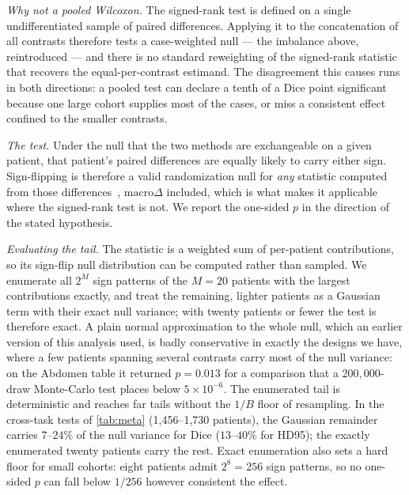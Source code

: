 \emph{Why not a pooled Wilcoxon.} The signed-rank test is defined on a
single undifferentiated sample of paired differences. Applying it to the
concatenation of all contrasts therefore tests a case-weighted null --- the
imbalance above, reintroduced --- and there is no standard reweighting of
the signed-rank statistic that recovers the equal-per-contrast estimand.
The disagreement this causes runs in both directions: a pooled test can
declare a tenth of a Dice point significant because one large cohort supplies
most of the cases, or miss a consistent effect confined to the smaller
contrasts.

\emph{The test.} Under the null that the two methods are exchangeable on a
given patient, that patient's paired differences are equally likely to carry
either sign. Sign-flipping is therefore a valid randomization null for \emph{any}
statistic computed from those differences~\cite{ernst2004permutation},
$\text{macro}\Delta$ included, which is what makes it applicable where the
signed-rank test is not. We
report the one-sided $p$ in the direction of the stated hypothesis.

\emph{Evaluating the tail.} The statistic is a weighted sum of per-patient
contributions, so its sign-flip null distribution can be computed rather than
sampled. We enumerate all $2^{M}$ sign patterns of the $M{=}20$ patients with
the largest contributions exactly, and treat the remaining, lighter patients as
a Gaussian term with their exact null variance; with twenty patients or fewer
the test is therefore exact. A plain normal approximation to the whole null,
which an earlier version of this analysis used, is badly conservative in
exactly the designs we have, where a few patients spanning several contrasts
carry most of the null variance: on the Abdomen table it returned $p=0.013$ for
a comparison that a $200{,}000$-draw Monte-Carlo test places below
$5\times10^{-6}$. The enumerated tail is deterministic and reaches far tails
without the $1/B$ floor of resampling. In the cross-task tests of
\cref{tab:meta} (1{,}456--1{,}730 patients), the Gaussian remainder carries
$7$--$24\%$ of the null variance for Dice ($13$--$40\%$ for HD95); the
exactly enumerated twenty patients carry the rest. Exact enumeration also sets a hard floor for small
cohorts: eight patients admit $2^8=256$ sign patterns, so no one-sided $p$
can fall below $1/256$ however consistent the effect.

